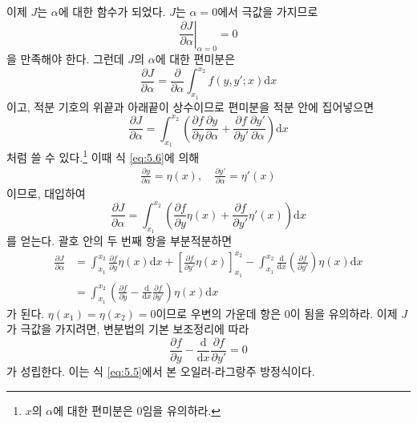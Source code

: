 \documentclass[chapter, oneside, b5paper]{oblivoir}
\theoremstyle{plain}
\theoremstyle{definition}
\theoremstyle{remark}
\begin{document}
이제 $J$는 $\alpha$에 대한 함수가 되었다. $J$는 $\alpha = 0$에서 극값을 가지므로
\begin{equation}
    {\left.\dfrac{\partial J}{\partial\alpha}\right|}_{\alpha = 0} = 0
\end{equation}
을 만족해야 한다. 그런데 $J$의 $\alpha$에 대한 편미분은
\begin{equation}
    \frac{\partial J}{\partial \alpha} = \frac{\partial}{\partial \alpha} \int_{x_1}^{x_2} f(y, y' ; x) \mathrm{d}x
\end{equation}
이고, 적분 기호의 위끝과 아래끝이 상수이므로 편미분을 적분 안에 집어넣으면
\begin{equation}
    \frac{\partial J}{\partial \alpha} = \int_{x_1}^{x_2} \left(\frac{\partial f}{\partial y} \frac{\partial y}{\partial \alpha} +  \frac{\partial f}{\partial y'} \frac{\partial y'}{\partial \alpha} \right) \mathrm{d}x
\end{equation}
처럼 쓸 수 있다.\footnote{$x$의 $\alpha$에 대한 편미분은 0임을 유의하라.} 이때 식 \ref{eq:5.6}에 의해
\begin{equation}
    \begin{aligned}
        \frac{\partial y}{\partial \alpha} = \eta(x), \quad  \frac{\partial y'}{\partial \alpha} = \eta'(x)
    \end{aligned}
\end{equation}
이므로, 대입하여
\begin{equation}
    \frac{\partial J}{\partial \alpha} = \int_{x_1}^{x_2} \left( \frac{\partial f}{\partial y} \eta(x) +  \frac{\partial f}{\partial y'} \eta'(x) \right) \mathrm{d}x
\end{equation}
를 얻는다. 괄호 안의 두 번째 항을 부분적분하면
\begin{equation}
    \begin{aligned}
        \frac{\partial J}{\partial \alpha} &= \int_{x_1}^{x_2} \frac{\partial f}{\partial y} \eta(x)\mathrm{d}x+ \left[\frac{\partial f}{\partial y'} \eta(x) \right]_{x_1}^{x_2} - \int_{x_1}^{x_2} \frac{\mathrm{d}}{\mathrm{d}x} \left(\frac{\partial f}{\partial y'} \right) \eta(x) \mathrm{d}x \\
        &=\int_{x_1}^{x_2} \left(\frac{\partial f}{\partial y}-\frac{\mathrm{d}}{\mathrm{d}x}\frac{\partial f}{\partial y'} \right) \eta(x) \mathrm{d}x
    \end{aligned}
    \label{eq:5.12}
\end{equation}
가 된다. $\eta(x_1)=\eta(x_2) =0$이므로 우변의 가운데 항은 0이 됨을 유의하라. 이제 $J$가 극값을 가지려면, 변분법의 기본 보조정리에 따라
\begin{equation*}
    \frac{\partial f}{\partial y} - \frac{\mathrm{d}}{\mathrm{d}x}\frac{\partial f}{\partial y'} = 0
\end{equation*}
가 성립한다. 이는 식 \ref{eq:5.5}에서 본 오일러-라그랑주 방정식이다.
\end{document}
